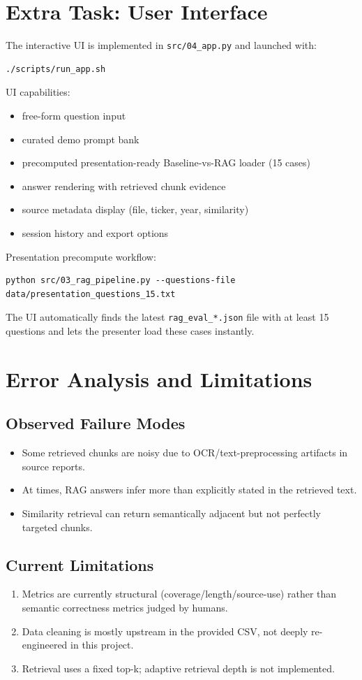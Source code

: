 \documentclass[11pt]{article}
\begin{document}
\section{Extra Task: User Interface}
The interactive UI is implemented in \texttt{src/04\_app.py} and launched with:
\begin{verbatim}
./scripts/run_app.sh
\end{verbatim}

UI capabilities:
\begin{itemize}
    \item free-form question input
    \item curated demo prompt bank
    \item precomputed presentation-ready Baseline-vs-RAG loader (15 cases)
    \item answer rendering with retrieved chunk evidence
    \item source metadata display (file, ticker, year, similarity)
    \item session history and export options
\end{itemize}

Presentation precompute workflow:
\begin{verbatim}
python src/03_rag_pipeline.py --questions-file data/presentation_questions_15.txt
\end{verbatim}
The UI automatically finds the latest \texttt{rag\_eval\_*.json} file with at least 15 questions and lets the presenter load these cases instantly.

\section{Error Analysis and Limitations}
\subsection{Observed Failure Modes}
\begin{itemize}
    \item Some retrieved chunks are noisy due to OCR/text-preprocessing artifacts in source reports.
    \item At times, RAG answers infer more than explicitly stated in the retrieved text.
    \item Similarity retrieval can return semantically adjacent but not perfectly targeted chunks.
\end{itemize}

\subsection{Current Limitations}
\begin{enumerate}
    \item Metrics are currently structural (coverage/length/source-use) rather than semantic correctness metrics judged by humans.
    \item Data cleaning is mostly upstream in the provided CSV, not deeply re-engineered in this project.
    \item Retrieval uses a fixed top-k; adaptive retrieval depth is not implemented.
\end{enumerate}
\end{document}
